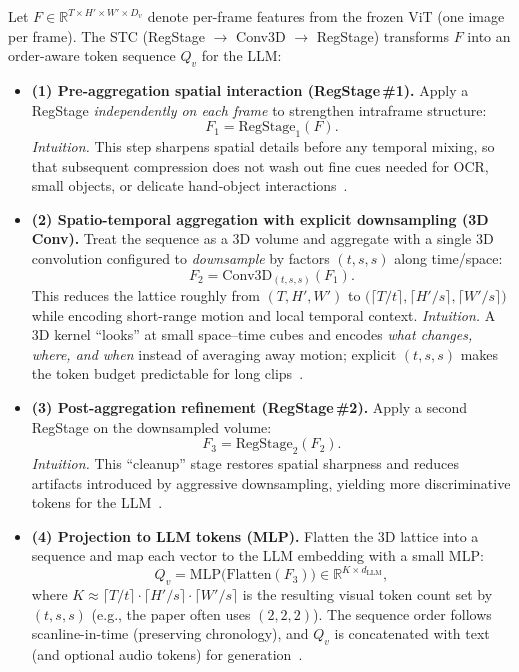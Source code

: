 \begin{enrichment}
\begin{enrichment}
        \medskip
        Let $F \in \mathbb{R}^{T \times H' \times W' \times D_v}$ denote per\mbox{-}frame features from the frozen ViT (one image per frame). The STC (RegStage $\rightarrow$ Conv3D $\rightarrow$ RegStage) transforms $F$ into an order\mbox{-}aware token sequence $Q_v$ for the LLM:
        \begin{itemize}
            \item \textbf{(1) Pre\mbox{-}aggregation spatial interaction (RegStage\,\#1).} Apply a RegStage \emph{independently on each frame} to strengthen intraframe structure:
            \[
            F_1 = \mathrm{RegStage}_1(F).
            \]
            \emph{Intuition.} This step sharpens spatial details before any temporal mixing, so that subsequent compression does not wash out fine cues needed for OCR, small objects, or delicate hand\mbox{-}object interactions~\cite[Sec.\,2.1]{cheng2024_videollama2}.
            \item \textbf{(2) Spatio\mbox{-}temporal aggregation with explicit downsampling (3D Conv).} Treat the sequence as a 3D volume and aggregate with a single 3D convolution configured to \emph{downsample} by factors $(t,s,s)$ along time/space:
            \[
            F_2 = \mathrm{Conv3D}_{(t,s,s)}(F_1).
            \]
            This reduces the lattice roughly from $(T,H',W')$ to $\big(\lceil T/t\rceil,\lceil H'/s\rceil,\lceil W'/s\rceil\big)$ while encoding short\mbox{-}range motion and local temporal context. \emph{Intuition.} A 3D kernel ``looks'' at small space–time cubes and encodes \emph{what changes, where, and when} instead of averaging away motion; explicit $(t,s,s)$ makes the token budget predictable for long clips~\cite[Sec.\,2.1; Tab.\,1]{cheng2024_videollama2}.
            \item \textbf{(3) Post\mbox{-}aggregation refinement (RegStage\,\#2).} Apply a second RegStage on the downsampled volume:
            \[
            F_3 = \mathrm{RegStage}_2(F_2).
            \]
            \emph{Intuition.} This ``cleanup'' stage restores spatial sharpness and reduces artifacts introduced by aggressive downsampling, yielding more discriminative tokens for the LLM~\cite[Sec.\,2.1]{cheng2024_videollama2}.
            \item \textbf{(4) Projection to LLM tokens (MLP).} Flatten the 3D lattice into a sequence and map each vector to the LLM embedding with a small MLP:
            \[
            Q_v = \mathrm{MLP}\!\big(\mathrm{Flatten}(F_3)\big) \in \mathbb{R}^{K \times d_{\mathrm{LLM}}},
            \]
            where $K \approx \lceil T/t\rceil \!\cdot\! \lceil H'/s\rceil \!\cdot\! \lceil W'/s\rceil$ is the resulting visual token count set by $(t,s,s)$ (e.g., the paper often uses $(2,2,2)$). The sequence order follows scanline-in-time (preserving chronology), and $Q_v$ is concatenated with text (and optional audio tokens) for generation~\cite[Sec.\,2.1]{cheng2024_videollama2}.
        \end{itemize}
        

\end{enrichment}
\end{enrichment}
